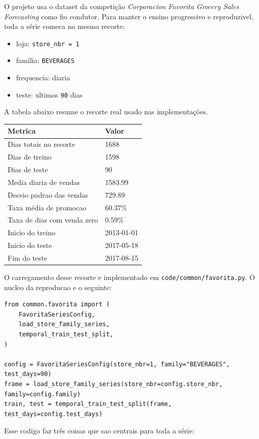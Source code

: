 \documentclass[12pt]{article}
\providecommand{\tightlist}{%
          \setlength{\itemsep}{0pt}\setlength{\parskip}{0pt}}
\begin{document}
O projeto usa o dataset da competição \emph{Corporacion Favorita Grocery Sales Forecasting} como fio condutor. Para manter o ensino progressivo e reproduzivel, toda a série comeca no mesmo recorte:

\begin{itemize}
\tightlist
\item
  loja: \texttt{store\_nbr\ =\ 1}
\item
  família: \texttt{BEVERAGES}
\item
  frequencia: diaria
\item
  teste: ultimos \texttt{90} dias
\end{itemize}

A tabela abaixo resume o recorte real usado nas implementações.

\begin{longtable}[]{@{}ll@{}}
\toprule\noalign{}
Metrica & Valor \\
\midrule\noalign{}
\endhead
\bottomrule\noalign{}
\endlastfoot
Dias totais no recorte & 1688 \\
Dias de treino & 1598 \\
Dias de teste & 90 \\
Media diaria de vendas & 1583.99 \\
Desvio padrao das vendas & 729.89 \\
Taxa média de promocao & 60.37\% \\
Taxa de dias com venda zero & 0.59\% \\
Inicio do treino & 2013-01-01 \\
Inicio do teste & 2017-05-18 \\
Fim do teste & 2017-08-15 \\
\end{longtable}

O carregamento desse recorte e implementado em \texttt{code/common/favorita.py}. O nucleo da reproducao e o seguinte:

\begin{verbatim}
from common.favorita import (
    FavoritaSeriesConfig,
    load_store_family_series,
    temporal_train_test_split,
)

config = FavoritaSeriesConfig(store_nbr=1, family="BEVERAGES", test_days=90)
frame = load_store_family_series(store_nbr=config.store_nbr, family=config.family)
train, test = temporal_train_test_split(frame, test_days=config.test_days)
\end{verbatim}

Esse codigo faz três coisas que sao centrais para toda a série:
\end{document}
